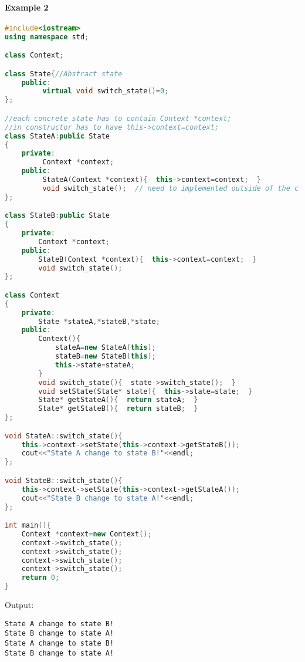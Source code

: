\documentclass{book}
\begin{document}
\paragraph{Example 2}\mbox{}
\begin{lstlisting}[caption={State Pattern exmaple 2}, language=C++]
#include<iostream>  
using namespace std;  

class Context;

class State{//Abstract state  
    public:  
         virtual void switch_state()=0;
};  

//each concrete state has to contain Context *context;  
//in constructor has to have this->context=context;
class StateA:public State
{  
    private:  
         Context *context;  
    public:  
         StateA(Context *context){  this->context=context;  }  
         void switch_state();  // need to implemented outside of the class
};  

class StateB:public State
{  
    private:  
        Context *context;  
    public:  
        StateB(Context *context){  this->context=context;  }  
        void switch_state();  
};  

class Context
{  
    private:  
        State *stateA,*stateB,*state;  
    public:  
        Context(){  
            stateA=new StateA(this);  
            stateB=new StateB(this);  
            this->state=stateA;  
        }  
        void switch_state(){  state->switch_state();  }  
        void setState(State* state){  this->state=state;  }  
        State* getStateA(){  return stateA;  }  
        State* getStateB(){  return stateB;  }  
};  

void StateA::switch_state(){  
    this->context->setState(this->context->getStateB());
    cout<<"State A change to state B!"<<endl;  
};  

void StateB::switch_state(){  
    this->context->setState(this->context->getStateA());
    cout<<"State B change to state A!"<<endl;  
};  

int main(){  
    Context *context=new Context();  
    context->switch_state();  
    context->switch_state();  
    context->switch_state();  
    context->switch_state();  
    return 0;  
}  
\end{lstlisting}
Output:
\begin{verbatim}
State A change to state B! 
State B change to state A! 
State A change to state B! 
State B change to state A! 
\end{verbatim}
\end{document}
